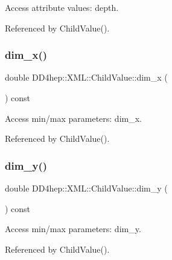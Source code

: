 Access attribute values\+: depth. 



Referenced by Child\+Value().

\hypertarget{struct_d_d4hep_1_1_x_m_l_1_1_child_value_a44f7119766182bb9057e76d97e712078}{}\label{struct_d_d4hep_1_1_x_m_l_1_1_child_value_a44f7119766182bb9057e76d97e712078} 
\subsubsection{\texorpdfstring{dim\+\_\+x()}{dim\_x()}}
{\footnotesize\ttfamily double D\+D4hep\+::\+X\+M\+L\+::\+Child\+Value\+::dim\+\_\+x (\begin{DoxyParamCaption}{ }\end{DoxyParamCaption}) const}



Access min/max parameters\+: dim\+\_\+x. 



Referenced by Child\+Value().

\hypertarget{struct_d_d4hep_1_1_x_m_l_1_1_child_value_a80243a2d575edd40cd06be9f8593c9d4}{}\label{struct_d_d4hep_1_1_x_m_l_1_1_child_value_a80243a2d575edd40cd06be9f8593c9d4} 
\subsubsection{\texorpdfstring{dim\+\_\+y()}{dim\_y()}}
{\footnotesize\ttfamily double D\+D4hep\+::\+X\+M\+L\+::\+Child\+Value\+::dim\+\_\+y (\begin{DoxyParamCaption}{ }\end{DoxyParamCaption}) const}



Access min/max parameters\+: dim\+\_\+y. 



Referenced by Child\+Value().

\hypertarget{struct_d_d4hep_1_1_x_m_l_1_1_child_value_a033a01f29a643501c779739e09810c60}{}\label{struct_d_d4hep_1_1_x_m_l_1_1_child_value_a033a01f29a643501c779739e09810c60} 
